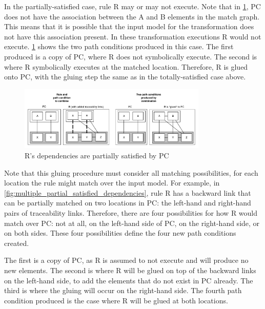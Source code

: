 In the partially-satisfied case, rule R may or may not execute. Note that in \cref{fig:partial_satisfied_dependencies}, PC does not have the association between the A and B elements in the match graph. This means that it is possible that the input model for the transformation does not have this association present. In these transformation executions R would not execute.
\cref{fig:partial_satisfied_dependencies} shows the two path conditions produced in this case. The first produced is a copy of PC, where R does not symbolically execute. The second is where R symbolically executes at the matched location. Therefore, R is glued onto PC, with the gluing step the same as in the totally-satisfied case above.

\begin{figure}[tb] \centering \includegraphics[width=0.8\textwidth]{./figures/building_path_conditions/partial_satisfied_dependencies.pdf}
	\caption{R's dependencies are partially satisfied by PC}
	\label{fig:partial_satisfied_dependencies}
\end{figure}

Note that this gluing procedure must consider all matching possibilities, for each location the rule might match over the input model. For example, in \cref{fig:multiple_partial_satisfied_dependencies}, rule R has a backward link that can be partially matched on two locations in PC: the left-hand and right-hand pairs of traceability links. Therefore, there are four possibilities for how R would match over PC: not at all, on the left-hand side of PC, on the right-hand side, or on both sides. These four possibilities define the four new path conditions created.

The first is a copy of PC, as R is assumed to not execute and will produce no new elements. The second is where R will be glued on top of the backward links on the left-hand side, to add the elements that do not exist in PC already. The third is where the gluing will occur on the right-hand side. The fourth path condition produced is the case where R will be glued at both locations. 


